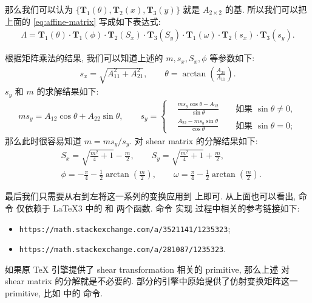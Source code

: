 \documentclass[
  hyper, lang=cn, 
  class=l3dox, 
]{../../zlatex/code/ztex}
\begin{document}
那么我们可以认为 $\{\mathbf{T}_1(\theta), \mathbf{T}_2(x), \mathbf{T}_3(y)\}$ 就是 $A_{2\times 2}$ 的基.
所以我们可以把上面的 \cref{eq:affine-matrix} 写成如下表达式:
\begin{align}\label{eq:affine-matrix-res}
  \Lambda = \mathbf{T}_1(\theta) \cdot \mathbf{T}_1(\phi)
  \cdot \mathbf{T}_2(S_x)\cdot \mathbf{T}_3(S_y)
  \cdot \mathbf{T}_1(\omega)\cdot \mathbf{T}_2(s_x)\cdot \mathbf{T}_3(s_y).
\end{align}

根据矩阵乘法的结果, 我们可以知道上述的 $m, s_x, S_x, \phi$ 等参数如下:
\begin{align*}
  s_x = \sqrt{A_{11}^2 + A_{21}^2},\qquad \theta = \arctan\left( \frac{A_{21}}{A_{11}} \right).
\end{align*}
$s_y$ 和 $m$ 的求解结果如下:
\begin{align*}
  ms_y = A_{12}\cos\theta + A_{22}\sin\theta,\qquad
  s_y = \left\{\begin{aligned}
    & \frac{m s_y\cos\theta - A_{12}}{\sin\theta} && \text{ 如果 } \sin\theta \neq 0, \\
    & \frac{A_{22} - m s_y\sin\theta}{\cos\theta} && \text{ 如果 } \sin\theta = 0;
  \end{aligned}\right. 
\end{align*}
那么此时很容易知道 $m = ms_y / s_y$. 对 shear matrix 的分解结果如下:
\begin{align*}
  & S_x = \sqrt{\frac{m^2}4+1} - \frac{m}2, \qquad
    S_y = \sqrt{\frac{m^2}4+1} + \frac{m}2, \\
  & \phi = -\frac{\pi}{4} - \frac{1}{2}\arctan(\frac{m}2), \qquad
    \omega = \frac{\pi}{4} - \frac{1}{2}\arctan(\frac{m}2).
\end{align*}

最后我们只需要从右到左将这一系列的变换应用到  上即可. 从上面也可以看出, 命令  
仅依赖于 \LaTeX3 中的  和  两个函数. 命令  实现
过程中相关的参考链接如下:
\begin{itemize}
  \item \texttt{https://math.stackexchange.com/a/3521141/1235323};
  \item \texttt{https://math.stackexchange.com/a/281087/1235323}.
\end{itemize}

\begin{leftbar}%
\noindent 如果原 \TeX{} 引擎提供了 shear transformation 相关的 primitive, 那么上述
对 shear matrix 的分解就是不必要的. 部分的引擎中原始提供了仿射变换矩阵这一 primitive, 
比如  中的 \cmd{\pdfsetmatrix} 命令.
\end{leftbar}
\end{document}
